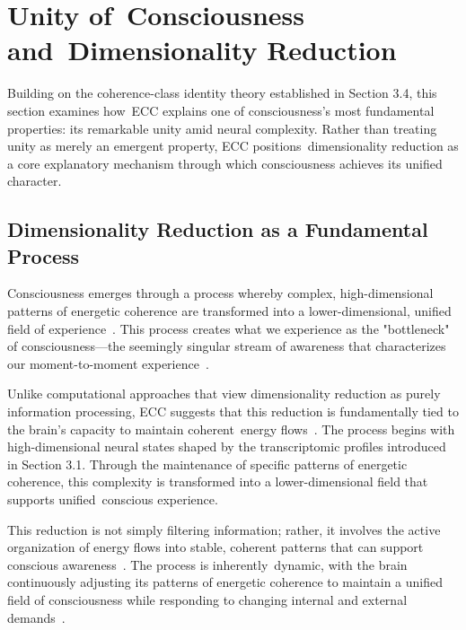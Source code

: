 \section{Unity of~Consciousness and~Dimensionality Reduction}

Building on the coherence-class identity theory established in Section 3.4, this section examines how~ECC explains one of consciousness's most fundamental properties: its remarkable unity amid neural complexity. Rather than treating unity as merely an emergent property, ECC positions~dimensionality reduction as a core explanatory mechanism through which consciousness achieves its unified character.

\subsection*{Dimensionality Reduction as a Fundamental Process}

Consciousness emerges through a process whereby complex, high-dimensional patterns of energetic coherence are transformed into a lower-dimensional, unified field of experience~\cite{da2024mathematical,zheng2025unbearable}. This process creates what we experience as the "bottleneck" of consciousness—the seemingly singular stream of awareness that characterizes our moment-to-moment experience~\cite{tononi2016integrated,bayne2010unity}.

Unlike computational approaches that view dimensionality reduction as purely information processing, ECC suggests that this reduction is fundamentally tied to the brain's capacity to maintain coherent~energy flows~\cite{dehaene2011experimental,breakspear2005dynamics}. The process begins with high-dimensional neural states shaped by the transcriptomic profiles introduced in Section 3.1. Through the maintenance of specific patterns of energetic coherence, this complexity is transformed into a lower-dimensional field that supports unified~conscious experience.

This reduction is not simply filtering information; rather, it involves the active organization of energy flows into stable, coherent patterns that can support conscious awareness~\cite{mashour2020conscious,pinotsis2023vivo}. The process is inherently~dynamic, with the brain continuously adjusting its patterns of energetic coherence to maintain a unified field of consciousness while responding to changing internal and external demands~\cite{carhart2014entropic,amil2024theta}.


